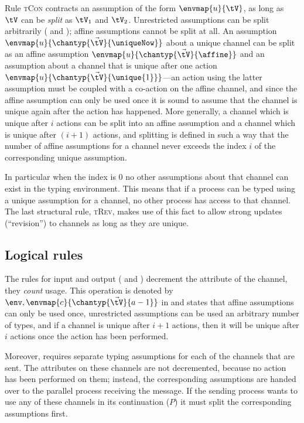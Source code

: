 \documentclass[copyright]{eptcs}
\begin{document}
Rule \textsc{tCon}  contracts an assumption of the form $\envmap{u}{\tV}$, as
long as $\tV$ can be \textit{split} as $\tV_1$ and $\tV_2$. Unrestricted
assumptions can be split arbitrarily ( and ); affine
assumptions cannot be split at all. An assumption
$\envmap{u}{\chantyp{\vec{\tV}}{\uniqueNow}}$ about a unique channel can be
split as an affine assumption $\envmap{u}{\chantyp{\vec{\tV}}{\affine}}$ and an
assumption about a channel that is unique after one action
$\envmap{u}{\chantyp{\vec{\tV}}{\unique{1}}}$---an action using the latter
assumption must be coupled with a co-action on the affine channel, and since
the affine assumption can only be used once it is sound to assume that the
channel is unique again after the action has happened. More generally, a
channel which is unique after $i$ actions can be split into an affine
assumption and a channel which is unique after $(i+1)$ actions, and splitting
is defined in such a way that the number of affine assumptions for a channel
never exceeds the index $i$ of the corresponding unique assumption. 

In particular when the index is 0 no other assumptions about that channel can
exist in the typing environment. This means that if a process can be typed
using a unique assumption for a channel, no other process has access to that
channel.  The last structural rule, \textsc{tRev}, makes use of this fact to
allow strong updates (``revision'') to channels as long as they are unique.   

\subsection{Logical rules}

The rules for input and output ( and ) decrement the
attribute of the channel, \ie they \emph{count} usage.  This operation is
denoted by $\env, \envmap{c}{\chantyp{\vec{\tV}}{a-1}}$ in
 and states that affine assumptions can only be used
once, unrestricted assumptions can be used an arbitrary number of types, and if
a channel is unique after $i\!+\!1$ actions, then it will be unique after $i$
actions once the action has been performed.

Moreover,  requires separate typing assumptions for each of the
channels that are sent. The attributes on these channels are not decremented,
because no action has been performed on them; instead, the corresponding
assumptions are handed over to the parallel process receiving the message. If the sending process
wants to use any of these channels in its continuation ($P$) it must split the
corresponding assumptions first. 
\end{document}
